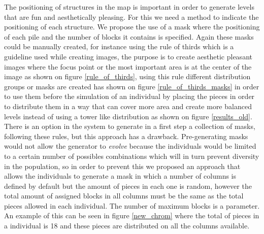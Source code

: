 \documentclass[conference]{IEEEtran}
\begin{document}
     The positioning of structures in the map is important in order to generate
     levels that are fun and aesthetically pleasing. For this we need a method to indicate the
     positioning of each structure. We propose the use of a mask where the
     positioning of each pile and the number of blocks it contains is specified.
     Again these masks could be manually created, for instance using the rule of
     thirds \cite{DarrenRowse} which is a guideline used while creating images,
     the purpose is to create aesthetic pleasant images where the focus point
     or the most important area is at the center of the image as shown on figure
     \ref{rule_of_thirds}, using this rule different distribution groups or
     masks are created has shown on figure \ref{rule_of_thirds_masks} in order
     to use them before the simulation of an individual by placing the pieces in
     order to distribute them in a way that can cover more area and create more
     balanced levels instead of using a tower like distribution as shown on
     figure \ref{results_old}. There is an option in the system to generate in a
     first step a collection of masks, following these rules, but this approach
     has a drawback. Pre-generating masks would not allow the generator to
     \textit{evolve} because the individuals would be limited to a certain
     number of possibles combinations which will in turn prevent diversity in
     the population, so in order to prevent this we proposed an approach that
     allows the individuals to generate a mask in which a number of columns is
     defined by default but the amount of pieces in each one is random, however
     the total amount of assigned blocks in all columns must be the same as the
     total pieces allowed in each individual. The number of maximum blocks is
     a parameter. An example of this can be seen in figure \ref{new_chrom} where
     the total of pieces in a individual is 18 and these pieces are distributed
     on all the columns available.
\end{document}
